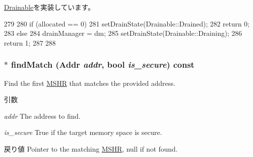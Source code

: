 \hyperlink{classDrainable_a1ed42c14f2f622ea6b0df3865e89c8b4}{Drainable}を実装しています。


\begin{DoxyCode}
279 {
280     if (allocated == 0) {
281         setDrainState(Drainable::Drained);
282         return 0;
283     } else {
284         drainManager = dm;
285         setDrainState(Drainable::Draining);
286         return 1;
287     }
288 }
\end{DoxyCode}
\hypertarget{classMSHRQueue_aab842d63dcd254dfe655e16075f7e0fe}{
\subsubsection[{findMatch}]{ $\ast$ findMatch ({\bf Addr} {\em addr}, \/  bool {\em is\_\-secure}) const}}
\label{classMSHRQueue_aab842d63dcd254dfe655e16075f7e0fe}
Find the first \hyperlink{classMSHR}{MSHR} that matches the provided address. 
\begin{DoxyParams}{引数}
\item[{\em addr}]The address to find. \item[{\em is\_\-secure}]True if the target memory space is secure. \end{DoxyParams}
\begin{DoxyReturn}{戻り値}
Pointer to the matching \hyperlink{classMSHR}{MSHR}, null if not found. 
\end{DoxyReturn}



